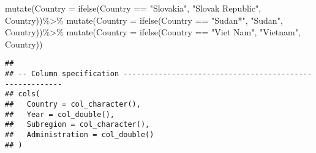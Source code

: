 \documentclass[
]{article}
\newenvironment{Shaded}{\begin{snugshade}}{\end{snugshade}}
\newcommand{\AttributeTok}[1]{\textcolor[rgb]{0.77,0.63,0.00}{#1}}
\newcommand{\FunctionTok}[1]{\textcolor[rgb]{0.00,0.00,0.00}{#1}}
\newcommand{\NormalTok}[1]{#1}
\newcommand{\SpecialCharTok}[1]{\textcolor[rgb]{0.00,0.00,0.00}{#1}}
\newcommand{\StringTok}[1]{\textcolor[rgb]{0.31,0.60,0.02}{#1}}
\begin{document}
\begin{Shaded}
\begin{Highlighting}[]
\FunctionTok{mutate}\NormalTok{(}\AttributeTok{Country =} \FunctionTok{ifelse}\NormalTok{(Country }\SpecialCharTok{==} \StringTok{"Slovakia"}\NormalTok{, }\StringTok{"Slovak Republic"}\NormalTok{, Country))}\SpecialCharTok{\%\textgreater{}\%}
\FunctionTok{mutate}\NormalTok{(}\AttributeTok{Country =} \FunctionTok{ifelse}\NormalTok{(Country }\SpecialCharTok{==} \StringTok{"Sudan*"}\NormalTok{, }\StringTok{"Sudan"}\NormalTok{, Country))}\SpecialCharTok{\%\textgreater{}\%}
\FunctionTok{mutate}\NormalTok{(}\AttributeTok{Country =} \FunctionTok{ifelse}\NormalTok{(Country }\SpecialCharTok{==} \StringTok{"Viet Nam"}\NormalTok{, }\StringTok{"Vietnam"}\NormalTok{, Country))}
\end{Highlighting}
\end{Shaded}

\begin{verbatim}
## 
## -- Column specification --------------------------------------------------------
## cols(
##   Country = col_character(),
##   Year = col_double(),
##   Subregion = col_character(),
##   Administration = col_double()
## )
\end{verbatim}
\end{document}
